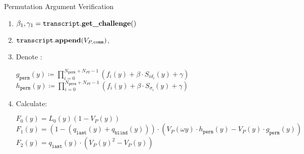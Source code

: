 \begin{algorithm}[H]
\caption{Permutation Argument Verification}
\begin{enumerate}
	\item $\beta_1, \gamma_1 = \texttt{transcript}.\textbf{get\_challenge}()$
    \item $\texttt{transcript}.\textbf{append}(V_{P, \texttt{comm}})$, 
    \item Denote :
	    \begin{center}
	    	$g_{\texttt{perm}}(y) \coloneqq \prod_{i = 0}^{N_{\texttt{perm}} + N_{PI} - 1} (f_i(y) + \beta \cdot  S_{id_i}(y) + \gamma)$ \\
	    	$h_{\texttt{perm}}(y) \coloneqq \prod_{i = 0}^{N_{\texttt{perm}} + N_{PI} - 1} (f_i(y) + \beta \cdot  S_{\sigma_i}(y) + \gamma)$
	    \end{center}
	\item Calculate:
	\begin{center}
		$F_0(y) = L_0(y)(1 - V_P(y))$ \\
        $F_1(y) = (1 - (q_{\texttt{last}}(y) + q_{\texttt{blind}}(y))) \cdot (
         					V_P(\omega y) \cdot h_{\texttt{perm}}(y)
          					- V_P(y) \cdot g_{\texttt{perm}}(y))$ \\
		$F_2(y) = q_{\texttt{last}}(y) \cdot (V_P(y)^2 - V_P(y))$
	\end{center}
\end{enumerate}
\end{algorithm}

